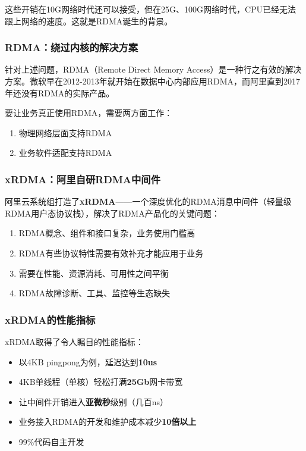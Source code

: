 这些开销在10G网络时代还可以接受，但在25G、100G网络时代，CPU已经无法跟上网络的速度。这就是RDMA诞生的背景。

\subsubsection{RDMA：绕过内核的解决方案}

针对上述问题，RDMA（Remote Direct Memory Access）是一种行之有效的解决方案。微软早在2012-2013年就开始在数据中心内部应用RDMA，而阿里直到2017年还没有RDMA的实际产品。

要让业务真正使用RDMA，需要两方面工作：
\begin{enumerate}
    \item 物理网络层面支持RDMA
    \item 业务软件适配支持RDMA
\end{enumerate}

\subsubsection{xRDMA：阿里自研RDMA中间件}

阿里云系统组打造了\textbf{xRDMA}——一个深度优化的RDMA消息中间件（轻量级RDMA用户态协议栈），解决了RDMA产品化的关键问题：

\begin{enumerate}
    \item RDMA概念、组件和接口复杂，业务使用门槛高
    \item RDMA有些协议特性需要有效补充才能应用于业务
    \item 需要在性能、资源消耗、可用性之间平衡
    \item RDMA故障诊断、工具、监控等生态缺失
\end{enumerate}

\subsubsection{xRDMA的性能指标}

xRDMA取得了令人瞩目的性能指标：
\begin{itemize}
    \item 以4KB pingpong为例，延迟达到\textbf{10us}
    \item 4KB单线程（单核）轻松打满\textbf{25Gb}网卡带宽
    \item 让中间件开销进入\textbf{亚微秒}级别（几百ns）
    \item 业务接入RDMA的开发和维护成本减少\textbf{10倍以上}
    \item 99\%代码自主开发
\end{itemize}

